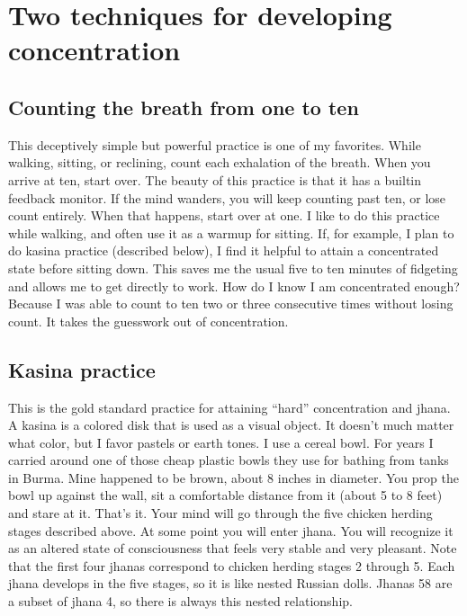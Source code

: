 \documentclass[a5paper,10pt,english]{book}
\begin{document}
\section{Two techniques for developing concentration}
\label{\detokenize{back-jhana-nana:two-techniques-for-developing-concentration}}

\subsection{Counting the breath from one to ten}
\label{\detokenize{back-jhana-nana:counting-the-breath-from-one-to-ten}}
\sphinxAtStartPar
This deceptively simple but powerful practice is one of my favorites.
While walking, sitting, or reclining, count each exhalation of the
breath. When you arrive at ten, start over. The beauty of this practice
is that it has a built\sphinxhyphen{}in feedback monitor. If the mind wanders, you
will keep counting past ten, or lose count entirely. When that happens,
start over at one. I like to do this practice while walking, and often
use it as a warmup for sitting. If, for example, I plan to do kasina
practice (described below), I find it helpful to attain a concentrated
state before sitting down. This saves me the usual five to ten minutes
of fidgeting and allows me to get directly to work. How do I know I am
concentrated enough? Because I was able to count to ten two or three
consecutive times without losing count. It takes the guesswork out of
concentration.


\subsection{Kasina practice}
\label{\detokenize{back-jhana-nana:kasina-practice}}
\sphinxAtStartPar
This is the gold standard practice for attaining “hard” concentration
and jhana. A kasina is a colored disk that is used as a visual object.
It doesn’t much matter what color, but I favor pastels or earth tones. I
use a cereal bowl. For years I carried around one of those cheap plastic
bowls they use for bathing from tanks in Burma. Mine happened to be
brown, about 8 inches in diameter. You prop the bowl up against the
wall, sit a comfortable distance from it (about 5 to 8 feet) and stare
at it. That’s it. Your mind will go through the five chicken herding
stages described above. At some point you will enter jhana. You will
recognize it as an altered state of consciousness that feels very stable
and very pleasant. Note that the first four jhanas correspond to chicken
herding stages 2 through 5. Each jhana develops in the five stages, so
it is like nested Russian dolls. Jhanas 5\sphinxhyphen{}8 are a subset of jhana 4, so
there is always this nested relationship.
\end{document}
